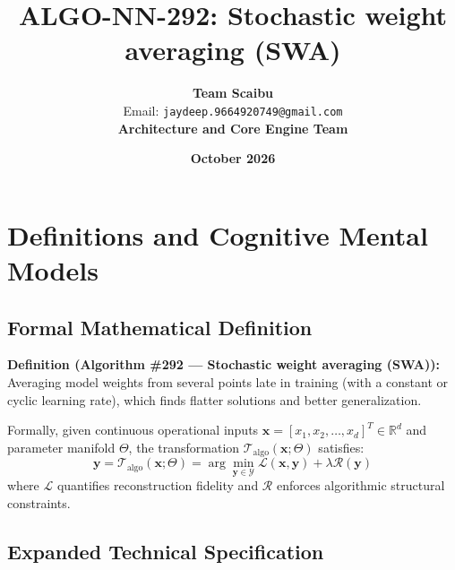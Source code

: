 \documentclass[11pt,a4paper]{article}
\title{\textbf{ALGO-NN-292: Stochastic weight averaging (SWA)}}
\author{\textbf{Team Scaibu} \\ \small Email: \texttt{jaydeep.9664920749@gmail.com} \\ \small \textbf{Architecture and Core Engine Team}}
\date{\textbf{October 2026}}
\theoremstyle{definition}
\begin{document}
\maketitle

\section{Definitions and Cognitive Mental Models}

\subsection{Formal Mathematical Definition}
\textbf{Definition (Algorithm \#292 --- Stochastic weight averaging (SWA)):}
Averaging model weights from several points late in training (with a constant or cyclic learning rate), which finds flatter solutions and better generalization.

Formally, given continuous operational inputs $\mathbf{x} = [x_1, x_2, \dots, x_d]^T \in \mathbb{R}^d$ and parameter manifold $\Theta$, the transformation $\mathcal{T}_{\text{algo}}(\mathbf{x}; \Theta)$ satisfies:
{\boldmath
\begin{equation}
\mathbf{y} = \mathcal{T}_{\text{algo}}(\mathbf{x}; \Theta) = \arg\min_{\mathbf{y} \in \mathcal{Y}} \mathcal{L}(\mathbf{x}, \mathbf{y}) + \lambda \mathcal{R}(\mathbf{y})
\end{equation}
}
where $\mathcal{L}$ quantifies reconstruction fidelity and $\mathcal{R}$ enforces algorithmic structural constraints.

\subsection{Expanded Technical Specification}
\end{document}
